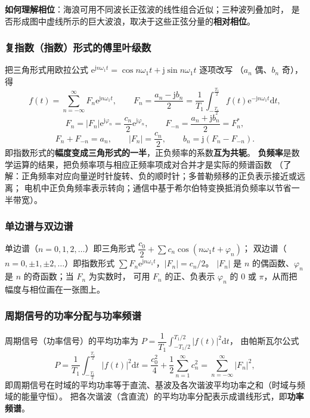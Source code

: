\textbf{如何理解相位}：海浪可用不同波长正弦波的线性组合近似；三种波列叠加时，
是否形成图中虚线所示的巨大波浪，取决于这些正弦分量的\textbf{相对相位}。

\subsubsection{复指数（指数）形式的傅里叶级数}

把三角形式用欧拉公式 $\mathrm{e}^{\mathrm{j}n\omega_1t}=\cos n\omega_1t+\mathrm{j}\sin n\omega_1t$ 逐项改写
（$a_n$ 偶、$b_n$ 奇），得
\begin{equation}
f(t)=\sum_{n=-\infty}^{\infty}F_n\mathrm{e}^{\mathrm{j}n\omega_1t},\qquad
F_n=\frac{a_n-\mathrm{j}b_n}{2}=\frac{1}{T_1}\int_{-\frac{T_1}{2}}^{\frac{T_1}{2}}f(t)\mathrm{e}^{-\mathrm{j}n\omega_1t}\mathrm{d}t,
\end{equation}
\begin{equation}
F_n=|F_n|\mathrm{e}^{\mathrm{j}\varphi_n}=\frac{c_n}{2}\mathrm{e}^{\mathrm{j}\varphi_n},\qquad
F_{-n}=\frac{a_n+\mathrm{j}b_n}{2}=F_n^{*},
\end{equation}
\begin{equation}
F_n+F_{-n}=a_n,\qquad |F_n|=\frac{c_n}{2},\qquad b_n=\mathrm{j}(F_n-F_{-n}).
\end{equation}
即指数形式的\textbf{幅度变成三角形式的一半}，正负频率的系数\textbf{互为共轭}。
\textbf{负频率}是数学运算的结果，把负频率项与相应正频率项成对合并才是实际的频谱函数
（了解：正角频率对应向量逆时针旋转、负的顺时针；多普勒频移的正负表示接近或远离；
电机中正负角频率表示转向；通信中基于希尔伯特变换抵消负频率以节省一半带宽）。

\subsubsection{单边谱与双边谱}

单边谱（$n=0,1,2,\dots$）即三角形式 $\dfrac{c_0}{2}+\sum c_n\cos(n\omega_1t+\varphi_n)$；
双边谱（$n=0,\pm1,\pm2,\dots$）即指数形式 $\sum F_n\mathrm{e}^{\mathrm{j}n\omega_1t}$，$|F_n|=c_n/2$。
$|F_n|$ 是 $n$ 的偶函数、$\varphi_n$ 是 $n$ 的奇函数；当 $F_n$ 为实数时，
可用 $F_n$ 的正、负表示 $\varphi_n$ 的 $0$ 或 $\pi$，从而把幅度与相位画在一张图上。

\subsubsection{周期信号的功率分配与功率频谱}

周期信号（功率信号）的平均功率为 $P=\dfrac{1}{T_1}\displaystyle\int_{-T_1/2}^{T_1/2}|f(t)|^2\mathrm{d}t$，
由帕斯瓦尔公式
\begin{equation}
P=\frac{1}{T_1}\int_{-\frac{T_1}{2}}^{\frac{T_1}{2}}\big|f(t)\big|^2\mathrm{d}t
=\frac{c_0^2}{4}+\frac12\sum_{n=1}^{\infty}c_n^2=\sum_{n=-\infty}^{\infty}\big|F_n\big|^2,
\end{equation}
即周期信号在时域的平均功率等于直流、基波及各次谐波平均功率之和（时域与频域的能量守恒）。
把各次谐波（含直流）的平均功率分配表示成谱线形式，即\textbf{功率频谱}。

